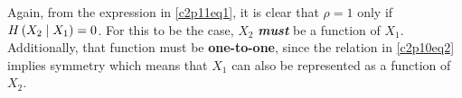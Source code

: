 \documentclass[ClusteringConnectionsMAIN.tex]{subfiles}
\begin{document}
	

  Again, from the expression in \ref{c2p11eq1}, it is clear that $\rho = 1$ only if $H \left( X_2 \mid X_1 \right) = 0$.  For this to be the case, $X_2$ \emph{\textbf{must}} be a function of $X_1$.  Additionally, that function must be \textbf{one-to-one}, since the relation in \ref{c2p10eq2} implies symmetry which means that $X_1$ can also be represented as a function of $X_2$.
\end{document}
